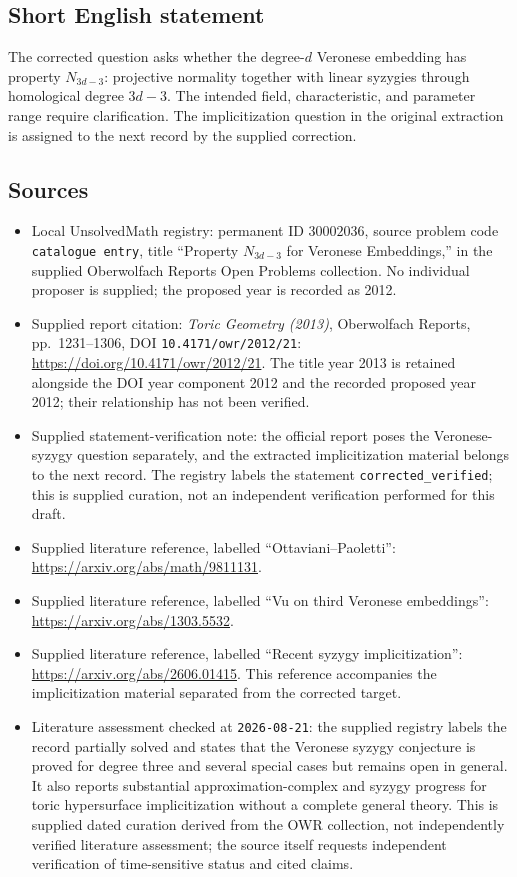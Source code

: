 \documentclass[11pt]{article}
\begin{document}
\subsection{Short English statement}
The corrected question asks whether the degree-\(d\) Veronese embedding has property \(N_{3d-3}\): projective normality together with linear syzygies through homological degree \(3d-3\). The intended field, characteristic, and parameter range require clarification. The implicitization question in the original extraction is assigned to the next record by the supplied correction.
\subsection{Sources}
\begin{itemize}
\item Local UnsolvedMath registry: permanent ID \(30002036\), source problem code \texttt{catalogue entry}, title ``Property \(N_{3d-3}\) for Veronese Embeddings,'' in the supplied Oberwolfach Reports Open Problems collection. No individual proposer is supplied; the proposed year is recorded as 2012.
\item Supplied report citation: \emph{Toric Geometry (2013)}, Oberwolfach Reports, pp.\ 1231--1306, DOI \texttt{10.4171/owr/2012/21}: \url{https://doi.org/10.4171/owr/2012/21}. The title year 2013 is retained alongside the DOI year component 2012 and the recorded proposed year 2012; their relationship has not been verified.
\item Supplied statement-verification note: the official report poses the Veronese-syzygy question separately, and the extracted implicitization material belongs to the next record. The registry labels the statement \texttt{corrected\_verified}; this is supplied curation, not an independent verification performed for this draft.
\item Supplied literature reference, labelled ``Ottaviani--Paoletti'': \url{https://arxiv.org/abs/math/9811131}.
\item Supplied literature reference, labelled ``Vu on third Veronese embeddings'': \url{https://arxiv.org/abs/1303.5532}.
\item Supplied literature reference, labelled ``Recent syzygy implicitization'': \url{https://arxiv.org/abs/2606.01415}. This reference accompanies the implicitization material separated from the corrected target.
\item Literature assessment checked at \texttt{2026-08-21}: the supplied registry labels the record partially solved and states that the Veronese syzygy conjecture is proved for degree three and several special cases but remains open in general. It also reports substantial approximation-complex and syzygy progress for toric hypersurface implicitization without a complete general theory. This is supplied dated curation derived from the OWR collection, not independently verified literature assessment; the source itself requests independent verification of time-sensitive status and cited claims.
\end{itemize}
\end{document}
